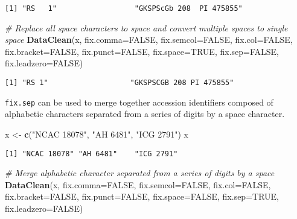 \documentclass[
]{article}
\newenvironment{Shaded}{\begin{snugshade}}{\end{snugshade}}
\newcommand{\CommentTok}[1]{\textcolor[rgb]{0.56,0.35,0.01}{\textit{#1}}}
\newcommand{\DataTypeTok}[1]{\textcolor[rgb]{0.13,0.29,0.53}{#1}}
\newcommand{\KeywordTok}[1]{\textcolor[rgb]{0.13,0.29,0.53}{\textbf{#1}}}
\newcommand{\NormalTok}[1]{#1}
\newcommand{\OtherTok}[1]{\textcolor[rgb]{0.56,0.35,0.01}{#1}}
\newcommand{\StringTok}[1]{\textcolor[rgb]{0.31,0.60,0.02}{#1}}
\begin{document}
\begin{verbatim}
[1] "RS   1"                  "GKSPScGb 208  PI 475855"
\end{verbatim}

\begin{Shaded}
\begin{Highlighting}[]
\CommentTok{# Replace all space characters to space and convert multiple spaces to single space}
\KeywordTok{DataClean}\NormalTok{(x, }\DataTypeTok{fix.comma=}\OtherTok{FALSE}\NormalTok{, }\DataTypeTok{fix.semcol=}\OtherTok{FALSE}\NormalTok{, }\DataTypeTok{fix.col=}\OtherTok{FALSE}\NormalTok{,}
          \DataTypeTok{fix.bracket=}\OtherTok{FALSE}\NormalTok{, }\DataTypeTok{fix.punct=}\OtherTok{FALSE}\NormalTok{,}
          \DataTypeTok{fix.space=}\OtherTok{TRUE}\NormalTok{,}
          \DataTypeTok{fix.sep=}\OtherTok{FALSE}\NormalTok{, }\DataTypeTok{fix.leadzero=}\OtherTok{FALSE}\NormalTok{)}
\end{Highlighting}
\end{Shaded}

\begin{verbatim}
[1] "RS 1"                   "GKSPSCGB 208 PI 475855"
\end{verbatim}

\texttt{fix.sep} can be used to merge together accession identifiers
composed of alphabetic characters separated from a series of digits by a
space character.

\begin{Shaded}
\begin{Highlighting}[]
\NormalTok{x <-}\StringTok{ }\KeywordTok{c}\NormalTok{(}\StringTok{"NCAC 18078"}\NormalTok{, }\StringTok{"AH 6481"}\NormalTok{, }\StringTok{"ICG 2791"}\NormalTok{)}
\NormalTok{x}
\end{Highlighting}
\end{Shaded}

\begin{verbatim}
[1] "NCAC 18078" "AH 6481"    "ICG 2791"  
\end{verbatim}

\begin{Shaded}
\begin{Highlighting}[]
\CommentTok{# Merge alphabetic character separated from a series of digits by a space}
\KeywordTok{DataClean}\NormalTok{(x, }\DataTypeTok{fix.comma=}\OtherTok{FALSE}\NormalTok{, }\DataTypeTok{fix.semcol=}\OtherTok{FALSE}\NormalTok{, }\DataTypeTok{fix.col=}\OtherTok{FALSE}\NormalTok{,}
          \DataTypeTok{fix.bracket=}\OtherTok{FALSE}\NormalTok{, }\DataTypeTok{fix.punct=}\OtherTok{FALSE}\NormalTok{, }\DataTypeTok{fix.space=}\OtherTok{FALSE}\NormalTok{,}
          \DataTypeTok{fix.sep=}\OtherTok{TRUE}\NormalTok{,}
          \DataTypeTok{fix.leadzero=}\OtherTok{FALSE}\NormalTok{)}
\end{Highlighting}
\end{Shaded}
\end{document}
